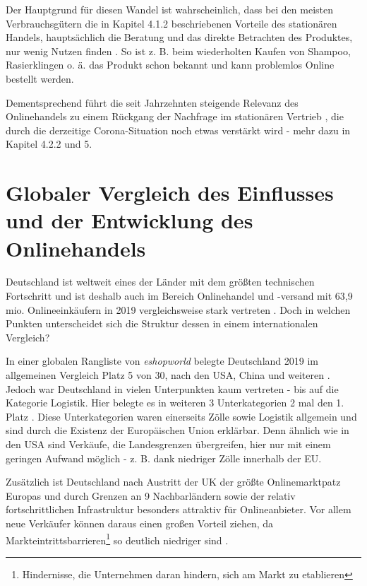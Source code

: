 \documentclass[a4paper, 12pt]{scrartcl}
\begin{document}
Der Hauptgrund für diesen Wandel ist wahrscheinlich, dass bei den meisten Verbrauchsgütern die in Kapitel 4.1.2 beschriebenen Vorteile des stationären Handels, hauptsächlich die Beratung und das direkte Betrachten des Produktes, nur wenig Nutzen finden \cite[S. 2]{Maier}. So ist z. B. beim wiederholten Kaufen von Shampoo, Rasierklingen o. ä. das Produkt schon bekannt und kann problemlos Online bestellt werden. 

Dementsprechend führt die seit Jahrzehnten steigende Relevanz des Onlinehandels zu einem Rückgang der Nachfrage im stationären Vertrieb \cite{Shankar}, die durch die derzeitige Corona-Situation noch etwas verstärkt wird - mehr dazu in Kapitel 4.2.2 und 5.

        \newpage
            
            
        
    \section{Globaler Vergleich des Einflusses und der Entwicklung des Onlinehandels}
    
    
    
    
    
Deutschland ist weltweit eines der Länder mit dem größten technischen Fortschritt und ist deshalb auch im Bereich Onlinehandel und -versand mit 63,9 mio. Onlineeinkäufern in 2019 vergleichsweise stark vertreten \cite[S. 8]{esworld}. Doch in welchen Punkten unterscheidet sich die Struktur dessen in einem internationalen Vergleich?

In einer globalen Rangliste von \emph{eshopworld} belegte Deutschland 2019 im allgemeinen Vergleich Platz 5 von 30, nach den USA, China und weiteren \cite[S. 3]{esworld}. Jedoch war Deutschland in vielen Unterpunkten kaum vertreten - bis auf die Kategorie Logistik. Hier belegte es in weiteren 3 Unterkategorien 2 mal den 1. Platz \cite[S. 10ff]{esworld}. Diese Unterkategorien waren einerseits Zölle sowie Logistik allgemein und sind durch die Existenz der Europäischen Union erklärbar. Denn ähnlich wie in den USA \cite[S. 4]{esworld} sind Verkäufe, die Landesgrenzen übergreifen, hier nur mit einem geringen Aufwand möglich - z. B. dank niedriger Zölle innerhalb der EU.

Zusätzlich ist Deutschland nach Austritt der UK der größte Onlinemarktpatz Europas und durch Grenzen an 9 Nachbarländern sowie der relativ fortschrittlichen Infrastruktur besonders attraktiv für Onlineanbieter. Vor allem neue Verkäufer können daraus einen großen Vorteil ziehen, da Markteintrittsbarrieren\footnote{Hindernisse, die Unternehmen daran hindern, sich am Markt zu etablieren} so deutlich niedriger sind \cite[S. 8]{esworld}.
\end{document}
